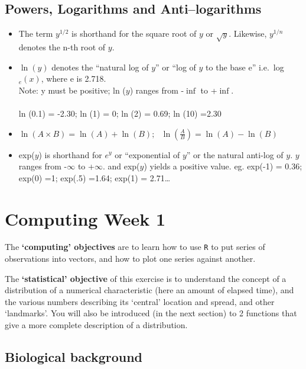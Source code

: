 \documentclass[]{book}
\begin{document}
\hypertarget{powers-logarithms-and-antilogarithms}{%
\section{Powers, Logarithms and Anti--logarithms}\label{powers-logarithms-and-antilogarithms}}

\begin{itemize}
\item
  The term \(y^{1/2}\) is shorthand for the square root of \(y\) or \(\sqrt{y}\). Likewise, \(y^{1/n}\) denotes the n-th root of \(y\).
\item
  \(\ln (y)\) denotes the ``natural log of \(y\)'' or ``log of \(y\) to
  the base e'' i.e.~log\(_e(x)\), where e is 2.718.\\
  Note: y must be positive; ln (\(y\)) ranges from -\(\inf\) to +\(\inf\).\\
  \hspace*{0.333em}\\
  ln (0.1) = -2.30; ln (1) = 0; ln (2) = 0.69; ln (10) =2.30
\item
  \(\ln(A \times B) = \ln(A) + \ln(B); \ \ \ \ln(\frac{A}{B}) = \ln(A) - \ln(B)\)
\item
  exp(\(y\)) is shorthand for \(e^y\) or ``exponential of \(y\)'' or the natural anti-log of \(y\). \(y\) ranges from -\(\infty\) to +\(\infty\). and exp(\(y\)) yields a positive value. eg. exp(-1) = 0.36; exp(0) =1; exp(.5) =1.64; exp(1) = 2.71\ldots{}
\end{itemize}

\hypertarget{computing01}{%
\chapter{Computing Week 1}\label{computing01}}

The \textbf{`computing' objectives} are to learn how to use \texttt{R} to put series of observations into vectors, and how to plot one series against another.

The \textbf{`statistical' objective} of this exercise is to understand the concept of a distribution of a numerical characteristic (here an amount of elapsed time), and the various numbers describing its `central' location and spread, and other `landmarks'. You will also be introduced (in the next section) to 2 functions that give a more complete description of a distribution.

\hypertarget{biological-background}{%
\section{Biological background}\label{biological-background}}
\end{document}
